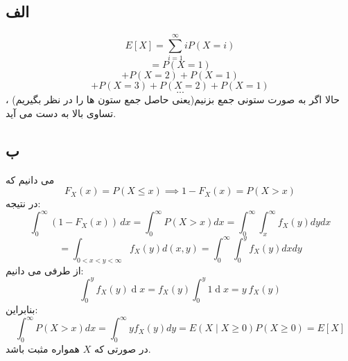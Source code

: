 \subsection*{الف}
$$E[X] = \sum_{i = 1}^{\infty} i P(X = i)$$
$$ = P(X = 1)$$
$$ + P(X = 2) + P(X = 1)$$
$$ + P(X = 3) + P(X = 2) + P(X = 1)$$
$$ . . .$$
حالا اگر به صورت ستونی جمع بزنیم(یعنی حاصل جمع ستون ها را در نظر بگیریم) ، تساوی بالا به دست می آید.
\subsection*{ب}
می دانیم که
$$F_X(x) = P(X \leq x) \implies 1 - F_X(x) = P(X > x)$$
در نتیجه:
$$\int_{0}^{\infty} (1-F_X(x))\,dx = \int_0^\infty P(X> x) dx = \int_0^\infty \int_x^\infty f_X(y) dy dx$$
$$= \int_{0< x< y< \infty} f_X(y) d (x,y) = \int_0^\infty \int_0^y f_X(y) dx dy$$
از طرفی می دانیم:
$$\int_0^y f_X(y)\operatorname d x = f_X(y) \int_0^y 1\operatorname d x = y~f_X(y)$$
بنابراین:
$$\int_0^\infty P(X> x)dx = \int_0^\infty yf_X(y) dy = E(X \mid X\geq 0)P(X\geq 0) = E[X]$$ 
در صورتی که $X$ همواره مثبت باشد.


